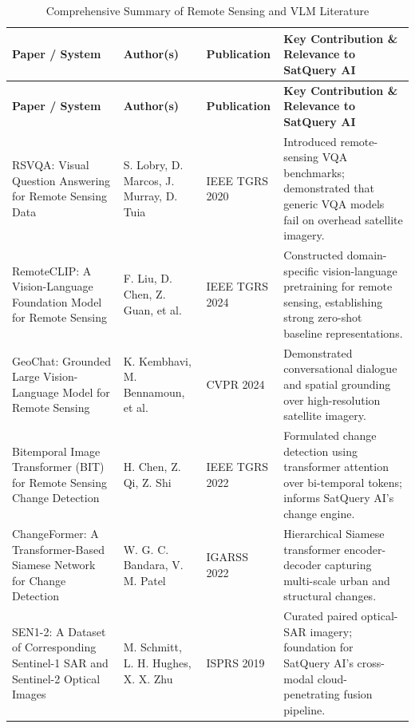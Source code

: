 \documentclass[12pt,a4paper]{report}
\begin{document}
\begin{singlespacing}
\small
\begin{longtable}{@{}p{}p{}p{}p{}@{}}
\caption{Comprehensive Summary of Remote Sensing and VLM Literature}\label{tab:lit_survey}\\
\toprule
\textbf{Paper / System} & \textbf{Author(s)} & \textbf{Publication} & \textbf{Key Contribution \& Relevance to SatQuery AI}\\
\midrule
\endfirsthead
\toprule
\textbf{Paper / System} & \textbf{Author(s)} & \textbf{Publication} & \textbf{Key Contribution \& Relevance to SatQuery AI}\\
\midrule
\endhead
\bottomrule
\endfoot

RSVQA: Visual Question Answering for Remote Sensing Data &
S. Lobry, D. Marcos, J. Murray, D. Tuia & IEEE TGRS 2020 &
Introduced remote-sensing VQA benchmarks; demonstrated that generic VQA models fail on overhead satellite imagery.\\[0.4em]

RemoteCLIP: A Vision-Language Foundation Model for Remote Sensing &
F. Liu, D. Chen, Z. Guan, et al. & IEEE TGRS 2024 &
Constructed domain-specific vision-language pretraining for remote sensing, establishing strong zero-shot baseline representations.\\[0.4em]

GeoChat: Grounded Large Vision-Language Model for Remote Sensing &
K. Kembhavi, M. Bennamoun, et al. & CVPR 2024 &
Demonstrated conversational dialogue and spatial grounding over high-resolution satellite imagery.\\[0.4em]

Bitemporal Image Transformer (BIT) for Remote Sensing Change Detection &
H. Chen, Z. Qi, Z. Shi & IEEE TGRS 2022 &
Formulated change detection using transformer attention over bi-temporal tokens; informs SatQuery AI's change engine.\\[0.4em]

ChangeFormer: A Transformer-Based Siamese Network for Change Detection &
W. G. C. Bandara, V. M. Patel & IGARSS 2022 &
Hierarchical Siamese transformer encoder-decoder capturing multi-scale urban and structural changes.\\[0.4em]

SEN1-2: A Dataset of Corresponding Sentinel-1 SAR and Sentinel-2 Optical Images &
M. Schmitt, L. H. Hughes, X. X. Zhu & ISPRS 2019 &
Curated paired optical-SAR imagery; foundation for SatQuery AI's cross-modal cloud-penetrating fusion pipeline.\\[0.4em]


\end{longtable}
\end{singlespacing}
\end{document}
